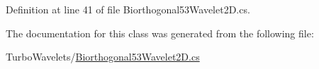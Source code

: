 \-Definition at line 41 of file \-Biorthogonal53\-Wavelet2\-D.\-cs.



\-The documentation for this class was generated from the following file\-:\begin{DoxyCompactItemize}
\item 
\-Turbo\-Wavelets/\hyperlink{_biorthogonal53_wavelet2_d_8cs}{\-Biorthogonal53\-Wavelet2\-D.\-cs}\end{DoxyCompactItemize}
